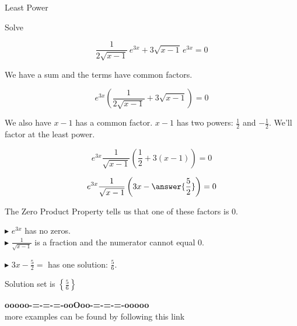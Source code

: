 \documentclass{ximera}
\begin{document}
\begin{example} Least Power



Solve 


\[  \frac{1}{2 \sqrt{x-1}} \, e^{3x}  + 3 \sqrt{x-1} \, e^{3x} = 0  \]


\begin{explanation} 

We have a sum and the terms have common factors.



\[  e^{3x}  \left( \frac{1}{2 \sqrt{x-1}}  + 3 \sqrt{x-1}  \right) = 0  \]



We also have $x-1$ has a common factor.  $x-1$ has two powers: $\tfrac{1}{2}$ and $-\tfrac{1}{2}$.  We'll factor at the least power.


\[  e^{3x}  \frac{1}{\sqrt{x-1}}   \left( \frac{1}{2}  + 3 (x-1)  \right) = 0 \]

\[  e^{3x}  \frac{1}{\sqrt{x-1}}   \left( 3x - \answer{\frac{5}{2}}  \right) = 0  \]





The Zero Product Property tells us that one of these factors is $0$.



$\blacktriangleright$   $e^{3x}$ has no zeros. \\


$\blacktriangleright$   $\frac{1}{\sqrt{x-1}}$ is a fraction and the numerator cannot equal $0$.


$\blacktriangleright$  $3x - \frac{5}{2} = $ has one solution:  $\frac{5}{6}$.



Solution set is $\left\{  \frac{5}{6} \right\}$

\end{explanation}
\end{example}

















\begin{center}
\textbf{\textcolor{green!50!black}{ooooo-=-=-=-ooOoo-=-=-=-ooooo}} \\

more examples can be found by following this link\\ 

\end{center}
\end{document}
